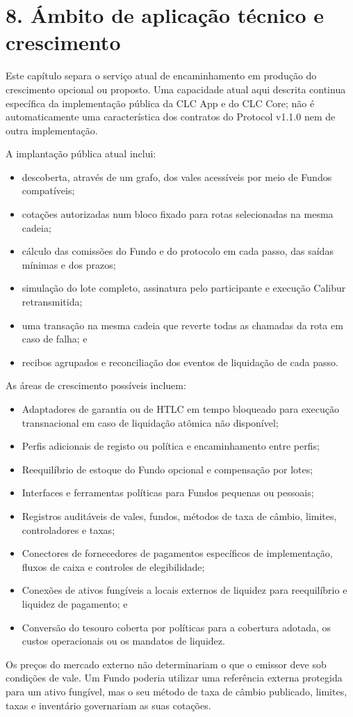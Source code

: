 \documentclass[11pt]{article}
\begin{document}
\section*{8. Ámbito de aplicação técnico e crescimento}

Este capítulo separa o serviço atual de encaminhamento em produção do crescimento opcional ou proposto. Uma capacidade atual aqui descrita continua específica da implementação pública da CLC App e do CLC Core; não é automaticamente uma característica dos contratos do Protocol v1.1.0 nem de outra implementação.

A implantação pública atual inclui:

\begin{itemize}[leftmargin=*]
\item descoberta, através de um grafo, dos vales acessíveis por meio de Fundos compatíveis;
\item cotações autorizadas num bloco fixado para rotas selecionadas na mesma cadeia;
\item cálculo das comissões do Fundo e do protocolo em cada passo, das saídas mínimas e dos prazos;
\item simulação do lote completo, assinatura pelo participante e execução Calibur retransmitida;
\item uma transação na mesma cadeia que reverte todas as chamadas da rota em caso de falha; e
\item recibos agrupados e reconciliação dos eventos de liquidação de cada passo.
\end{itemize}
As áreas de crescimento possíveis incluem:

\begin{itemize}[leftmargin=*]
\item Adaptadores de garantia ou de HTLC em tempo bloqueado para execução transnacional em caso de liquidação atômica não disponível;
\item Perfis adicionais de registo ou política e encaminhamento entre perfis;
\item Reequilíbrio de estoque do Fundo opcional e compensação por lotes;
\item Interfaces e ferramentas políticas para Fundos pequenas ou pessoais;
\item Registros auditáveis de vales, fundos, métodos de taxa de câmbio, limites, controladores e taxas;
\item Conectores de fornecedores de pagamentos específicos de implementação, fluxos de caixa e controles de elegibilidade;
\item Conexões de ativos fungíveis a locais externos de liquidez para reequilíbrio e liquidez de pagamento; e
\item Conversão do tesouro coberta por políticas para a cobertura adotada, os custos operacionais ou os mandatos de liquidez.
\end{itemize}
Os preços do mercado externo não determinariam o que o emissor deve sob condições de vale. Um Fundo poderia utilizar uma referência externa protegida para um ativo fungível, mas o seu método de taxa de câmbio publicado, limites, taxas e inventário governariam as suas cotações.
\end{document}
